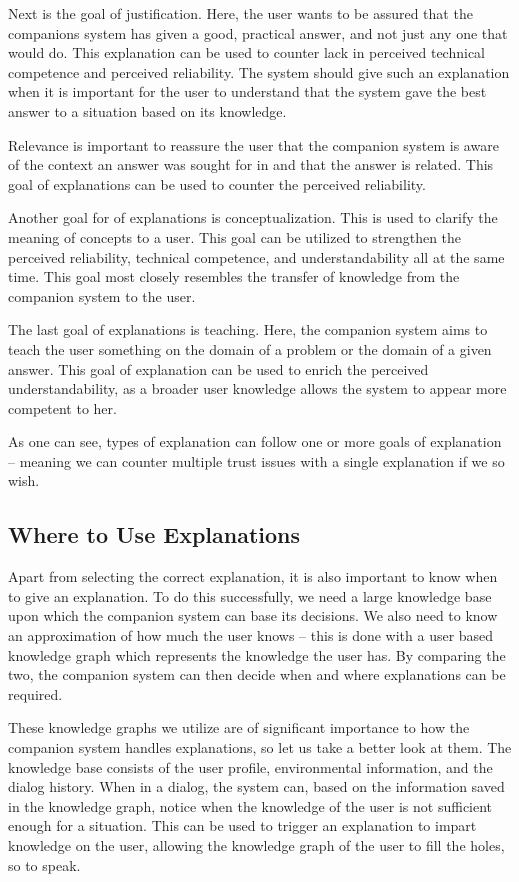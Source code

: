 \documentclass[a4paper]{article}
\begin{document}
Next is the goal of justification. Here, the user wants to be assured that the companions system has given a good, practical answer, and not just any one that would do. This explanation can be used to counter lack in perceived technical competence and perceived reliability. The system should give such an explanation when it is important for the user to understand that the system gave the best answer to a situation based on its knowledge.

Relevance is important to reassure the user that the companion system is aware of the context an answer was sought for in and that the answer is related. This goal of explanations can be used to counter the perceived reliability.

Another goal for of explanations is conceptualization. This is used to clarify the meaning of concepts to a user. This goal can be utilized to strengthen the perceived reliability, technical competence, and understandability all at the same time. This goal most closely resembles the transfer of knowledge from the companion system to the user.

The last goal of explanations is teaching. Here, the companion system aims to teach the user something on the domain of a problem or the domain of a given answer. This goal of explanation can be used to enrich the perceived understandability, as a broader user knowledge allows the system to appear more competent to her.

As one can see, types of explanation can follow one or more goals of explanation – meaning we can counter multiple trust issues with a single explanation if we so wish.

\subsection{Where to Use Explanations}

Apart from selecting the correct explanation, it is also important to know when to give an explanation. To do this successfully, we need a large knowledge base upon which the companion system can base its decisions. We also need to know an approximation of how much the user knows – this is done with a user based knowledge graph which represents the knowledge the user has. By comparing the two, the companion system can then decide when and where explanations can be required.

These knowledge graphs we utilize are of significant importance to how the companion system handles explanations, so let us take a better look at them. The knowledge base consists of the user profile, environmental information, and the dialog history. When in a dialog, the system can, based on the information saved in the knowledge graph, notice when the knowledge of the user is not sufficient enough for a situation. This can be used to trigger an explanation to impart knowledge on the user, allowing the knowledge graph of the user to fill the holes, so to speak.
\end{document}
